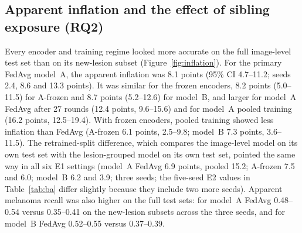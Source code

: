 \subsection{Apparent inflation and the effect of sibling exposure (RQ2)}
\label{sec:res-leakage}

Every encoder and training regime looked more accurate on the full image-level test set than on its
new-lesion subset (Figure~\ref{fig:inflation}). For the primary FedAvg model~A, the apparent inflation was
8.1 points (95\% CI 4.7--11.2; seeds 2.4, 8.6 and 13.3 points). It was similar for the frozen encoders,
8.2 points (5.0--11.5) for A-frozen and 8.7 points (5.2--12.6) for model~B, and larger for model~A FedAvg
after 27 rounds (12.4 points, 9.6--15.6) and for model~A pooled training (16.2 points, 12.5--19.4). With
frozen encoders, pooled training showed less inflation than FedAvg (A-frozen 6.1 points, 2.5--9.8;
model~B 7.3 points, 3.6--11.5). The retrained-split difference, which compares the image-level model on
its own test set with the lesion-grouped model on its own test set, pointed the same way in all six
E1 settings (model~A FedAvg 6.9 points, pooled 15.2; A-frozen 7.5 and 6.0; model~B 6.2 and 3.9; three
seeds; the five-seed E2 values in Table~\ref{tab:ba} differ slightly because they include two more
seeds). Apparent melanoma recall was also higher on the full test sets: for model~A FedAvg 0.48--0.54
versus 0.35--0.41 on the new-lesion subsets across the three seeds, and for model~B FedAvg 0.52--0.55
versus 0.37--0.39.

